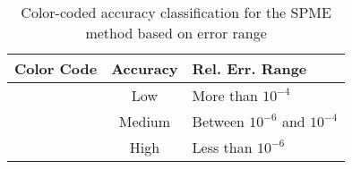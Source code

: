 \begin{table}[H]
\centering
\begin{tabular}{|l|c|l|}
\hline
\textbf{Color Code}      & \textbf{Accuracy} & \textbf{Rel. Err. Range}                                      \\ \hline
\cellcolor[HTML]{F0F7DA} & Low               & More than $10^{-4}$                      \\ \hline
\cellcolor[HTML]{C9DF8A} & Medium            & Between $10^{-6}$ and $10^{-4}$ \\ \hline
\cellcolor[HTML]{77AB59} & High              & Less than $10^{-6}$                      \\ \hline
\end{tabular}
\caption{Color-coded accuracy classification for the SPME method based on error range}
\label{tab:accuracy-refer}
\end{table}